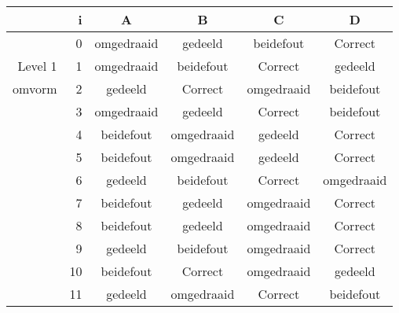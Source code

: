 \begin{tabular}{ rr| c|c|c|c}\hline\hline
     & i & \textbf{A} & \textbf{B} & \textbf{C} & \textbf{D}\\\hline

&0&omgedraaid&gedeeld&beidefout&Correct\cellcolor[gray]{0.6}\\
Level 1 & 1&omgedraaid&beidefout&Correct\cellcolor[gray]{0.6}&gedeeld\\
omvorm &2&gedeeld&Correct\cellcolor[gray]{0.6}&omgedraaid&beidefout\\
&3&omgedraaid&gedeeld&Correct\cellcolor[gray]{0.6}&beidefout\\
&4&beidefout&omgedraaid&gedeeld&Correct\cellcolor[gray]{0.6}\\
&5&beidefout&omgedraaid&gedeeld&Correct\cellcolor[gray]{0.6}\\
&6&gedeeld&beidefout&Correct\cellcolor[gray]{0.6}&omgedraaid\\
&7&beidefout&gedeeld&omgedraaid&Correct\cellcolor[gray]{0.6}\\
&8&beidefout&gedeeld&omgedraaid&Correct\cellcolor[gray]{0.6}\\
&9&gedeeld&beidefout&omgedraaid&Correct\cellcolor[gray]{0.6}\\
&10&beidefout&Correct\cellcolor[gray]{0.6}&omgedraaid&gedeeld\\
&11&gedeeld&omgedraaid&Correct\cellcolor[gray]{0.6}&beidefout\\
\hline\end{tabular}\par\ \newline

